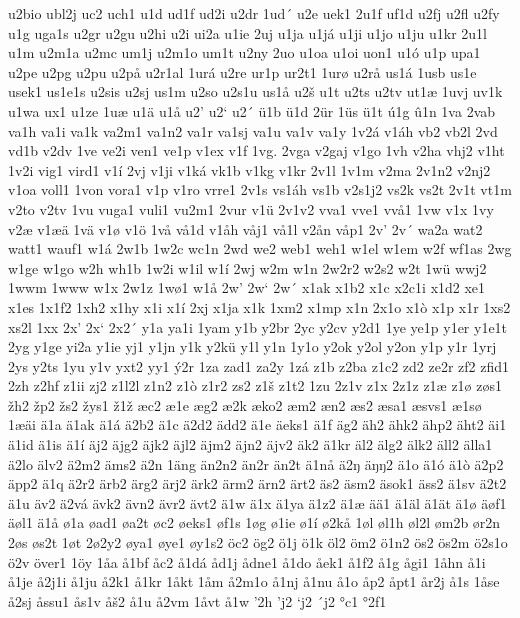 u2bio
ubl2j
uc2
uch1
u1d
ud1f
ud2i
u2dr
1ud´
u2e
uek1
2u1f
uf1d
u2fj
u2fl
u2fy
u1g
uga1s
u2gr
u2gu
u2hi
u2i
ui2a
u1ie
2uj
u1ja
u1já
u1ji
u1jo
u1ju
u1kr
2u1l
u1m
u2m1a
u2mc
um1j
u2m1o
um1t
u2ny
2uo
u1oa
u1oi
uon1
u1ó
u1p
upa1
u2pe
u2pg
u2pu
u2på
u2r1al
1urá
u2re
ur1p
ur2t1
1urø
u2rå
us1á
1usb
us1e
usek1
us1e1s
u2sis
u2sj
us1m
u2so
u2s1u
us1å
u2š
u1t
u2ts
u2tv
ut1æ
1uvj
uv1k
u1wa
ux1
u1ze
1uæ
u1ä
u1å
u2'
u2`
u2´
ü1b
ü1d
2ür
1üs
ü1t
ú1g
û1n
1va
2vab
va1h
va1i
va1k
va2m1
va1n2
va1r
va1sj
va1u
va1v
va1y
1v2á
v1áh
vb2
vb2l
2vd
vd1b
v2dv
1ve
ve2i
ven1
ve1p
v1ex
v1f
1vg.
2vga
v2gaj
v1go
1vh
v2ha
vhj2
v1ht
1v2i
vig1
vird1
v1í
2vj
v1ji
v1ká
vk1b
v1kg
v1kr
2v1l
1v1m
v2ma
2v1n2
v2nj2
v1oa
voll1
1von
vora1
v1p
v1ro
vrre1
2v1s
vs1áh
vs1b
v2s1j2
vs2k
vs2t
2v1t
vt1m
v2to
v2tv
1vu
vuga1
vuli1
vu2m1
2vur
v1ü
2v1v2
vva1
vve1
vvå1
1vw
v1x
1vy
v2æ
v1æä
1vä
v1ø
v1ö
1vå
vå1d
v1åh
våj1
vå1l
v2ån
våp1
2v'
2v´
wa2a
wat2
watt1
wauf1
w1á
2w1b
1w2c
wc1n
2wd
we2
web1
weh1
w1el
w1em
w2f
wf1as
2wg
w1ge
w1go
w2h
wh1b
1w2i
w1il
w1í
2wj
w2m
w1n
2w2r2
w2s2
w2t
1wü
wwj2
1wwm
1www
w1x
2w1z
1wø1
w1å
2w'
2w`
2w´
x1ak
x1b2
x1c
x2c1i
x1d2
xe1
x1es
1x1f2
1xh2
x1hy
x1i
x1í
2xj
x1ja
x1k
1xm2
x1mp
x1n
2x1o
x1ò
x1p
x1r
1xs2
xs2l
1xx
2x'
2x`
2x2´
y1a
ya1i
1yam
y1b
y2br
2yc
y2cv
y2d1
1ye
ye1p
y1er
y1e1t
2yg
y1ge
yi2a
y1ie
yj1
y1jn
y1k
y2kü
y1l
y1n
1y1o
y2ok
y2ol
y2on
y1p
y1r
1yrj
2ys
y2ts
1yu
y1v
yxt2
yy1
ý2r
1za
zad1
za2y
1zá
z1b
z2ba
z1c2
zd2
ze2r
zf2
zfid1
2zh
z2hf
z1ii
zj2
z1l2l
z1n2
z1ò
z1r2
zs2
z1š
z1t2
1zu
2z1v
z1x
2z1z
z1æ
z1ø
zøs1
žh2
žp2
žs2
žys1
ž1ž
æc2
æ1e
æg2
æ2k
æko2
æm2
æn2
æs2
æsa1
æsvs1
æ1sø
1æäi
ä1a
ä1ak
ä1á
ä2b2
ä1c
ä2d2
ädd2
ä1e
äeks1
ä1f
äg2
äh2
ähk2
ähp2
äht2
äi1
ä1id
ä1is
ä1í
äj2
äjg2
äjk2
äjl2
äjm2
äjn2
äjv2
äk2
ä1kr
äl2
älg2
älk2
äll2
älla1
ä2lo
älv2
ä2m2
äms2
ä2n
1äng
än2n2
än2r
än2t
ä1nå
ä2ŋ
äŋŋ2
ä1o
ä1ó
ä1ò
ä2p2
äpp2
ä1q
ä2r2
ärb2
ärg2
ärj2
ärk2
ärm2
ärn2
ärt2
äs2
äsm2
äsok1
äss2
ä1sv
ä2t2
ä1u
äv2
ä2vá
ävk2
ävn2
ävr2
ävt2
ä1w
ä1x
ä1ya
ä1z2
ä1æ
ää1
ä1äl
ä1ät
ä1ø
äøf1
äøl1
ä1å
ø1a
øad1
øa2t
øc2
øeks1
øf1s
1øg
ø1ie
ø1í
ø2kå
1øl
øl1h
øl2l
øm2b
ør2n
2øs
øs2t
1øt
2ø2y2
øya1
øye1
øy1s2
öc2
ög2
ö1j
ö1k
öl2
öm2
ö1n2
ös2
ös2m
ö2s1o
ö2v
över1
1öy
1åa
å1bf
åc2
å1dá
åd1j
ådne1
å1do
åek1
å1f2
å1g
ågi1
1åhn
å1i
å1je
å2j1i
å1ju
å2k1
å1kr
1åkt
1åm
å2m1o
å1nj
å1nu
å1o
åp2
åpt1
år2j
å1s
1åse
å2sj
åssu1
ås1v
åš2
å1u
å2vm
1åvt
å1w
'2h
'j2
`j2
´j2
°c1
°2f1
